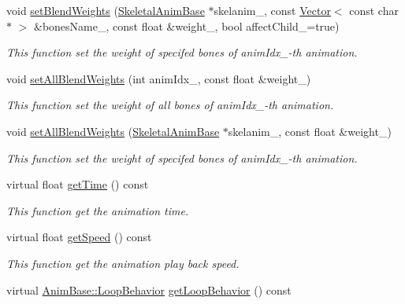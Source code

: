 \begin{DoxyCompactItemize}
void \hyperlink{class_i_dream_sky_1_1_skeletal_anim_blender_a9aa907fdb5dc8bb6efb4236ac4a6b311}{set\+Blend\+Weights} (\hyperlink{class_i_dream_sky_1_1_skeletal_anim_base}{Skeletal\+Anim\+Base} $\ast$skelanim\+\_\+, const \hyperlink{class_i_dream_sky_1_1_vector}{Vector}$<$ const char $\ast$ $>$ \&bones\+Name\+\_\+, const float \&weight\+\_\+, bool affect\+Child\+\_\+=true)
\begin{DoxyCompactList}\small\item\em This function set the weight of specifed bones of anim\+Idx\+\_\+-\/th animation. \end{DoxyCompactList}\item 
void \hyperlink{class_i_dream_sky_1_1_skeletal_anim_blender_a358dfbf2b4345c216156a6d50c5e6e20}{set\+All\+Blend\+Weights} (int anim\+Idx\+\_\+, const float \&weight\+\_\+)
\begin{DoxyCompactList}\small\item\em This function set the weight of all bones of anim\+Idx\+\_\+-\/th animation. \end{DoxyCompactList}\item 
void \hyperlink{class_i_dream_sky_1_1_skeletal_anim_blender_a7912c9db93ae4237c518475c34811ed0}{set\+All\+Blend\+Weights} (\hyperlink{class_i_dream_sky_1_1_skeletal_anim_base}{Skeletal\+Anim\+Base} $\ast$skelanim\+\_\+, const float \&weight\+\_\+)
\begin{DoxyCompactList}\small\item\em This function set the weight of specifed bones of anim\+Idx\+\_\+-\/th animation. \end{DoxyCompactList}\item 
virtual float \hyperlink{class_i_dream_sky_1_1_skeletal_anim_blender_a1c35d25c9c59c8d867271004a36be82a}{get\+Time} () const 
\begin{DoxyCompactList}\small\item\em This function get the animation time. \end{DoxyCompactList}\item 
virtual float \hyperlink{class_i_dream_sky_1_1_skeletal_anim_blender_a1a5fb941a66118b46991c41e7a77d6ad}{get\+Speed} () const 
\begin{DoxyCompactList}\small\item\em This function get the animation play back speed. \end{DoxyCompactList}\item 
virtual \hyperlink{class_i_dream_sky_1_1_anim_base_aac1c8b7253df068cf02101dcd4f586e2}{Anim\+Base\+::\+Loop\+Behavior} \hyperlink{class_i_dream_sky_1_1_skeletal_anim_blender_a1f09f358071ec980a3783db1cc63c609}{get\+Loop\+Behavior} () const 

\end{DoxyCompactItemize}
